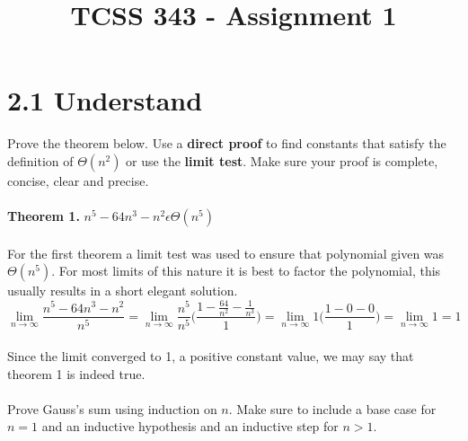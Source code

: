 \documentclass[12pt]{article}
\begin{document}
\title{TCSS 343 - Assignment 1}
\maketitle


\section{2.1 Understand}

Prove the theorem below. 
Use a \textbf{direct proof} to find constants that satisfy the definition of \begin{math}\Theta(n^2)\end{math} or use the \textbf{limit test}.  
Make sure your proof is complete, concise, clear and precise.
\\\\\textbf{Theorem 1.} 
\begin{math}n^5-64n^3-n^2 \epsilon \Theta(n^5)\end{math}
\\\\For the first theorem a limit test was used to ensure that polynomial given was \begin{math}\Theta(n^5)\end{math}. For most limits of 
this nature it is best to factor the polynomial, this usually results in a short elegant solution. 
\[ \lim_{n \to \infty}  \frac{n^5-64n^3-n^2}{n^5} = \lim_{n \to \infty} \frac{n^5}{n^5}\Bigg(\frac{1-\frac{64}{n^2}-\frac{1}{n^3}}{1}\Bigg) = \lim_{n \to \infty} 1\Bigg(\frac{1-0-0}{1}\Bigg) = \lim_{n \to \infty} 1 = 1\]
\\Since the limit converged to 1, a positive constant value, we may say that theorem 1 is indeed true.\\\\


\noindent Prove Gauss’s sum using induction on \begin{math}n\end{math}. Make sure to include a base case for \begin{math} n = 1\end{math} and an inductive hypothesis and an inductive step for \begin{math}n > 1\end{math}.\\
\end{document}
